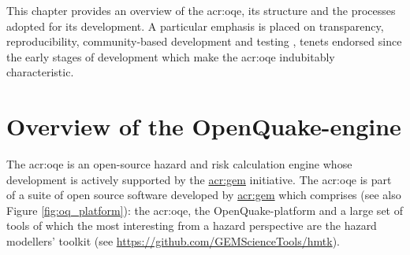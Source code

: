 This chapter provides an overview of the \gls{acr:oqe}, 
its structure and the processes adopted for its development. 
A particular emphasis is placed on transparency, reproducibility,
community-based development and testing \parencite{pagani2014}, 
tenets endorsed since the early stages of development which make
the \gls{acr:oqe} indubitably characteristic. 
%
\section{Overview of the OpenQuake-engine}
%
The \gls{acr:oqe} is an open-source hazard and risk calculation engine 
whose development is actively supported by the 
\href{http://globalquakemodel.org}{\gls{acr:gem}} initiative.
%
The \gls{acr:oqe} is part of a suite of open source software developed by 
\href{http://globalquakemodel.org}{\gls{acr:gem}} which comprises
(see also Figure \ref{fig:oq_platform}): 
the \gls{acr:oqe}, the OpenQuake-platform and a large set of tools of which 
the most interesting from a hazard perspective are the hazard modellers' 
toolkit (see \href{https://github.com/GEMScienceTools/hmtk}
{https://github.com/GEMScienceTools/hmtk}).


